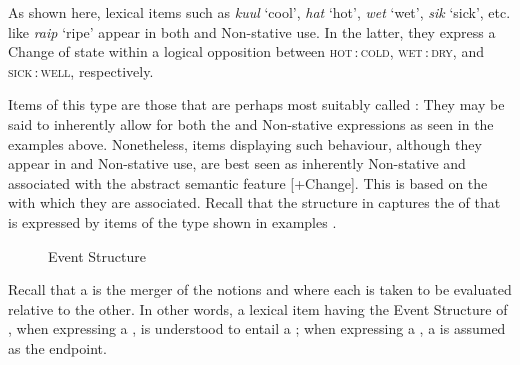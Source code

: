 
\z
\z

As shown here, lexical items such as \textit{kuul} `cool', \textit{hat} `hot', \textit{wet} `wet', \textit{sik} `sick', etc. like \textit{raip} `ripe' appear in both  and Non-stative use. In the latter, they express a Change of state within a logical opposition between \textsc{hot\,:\,cold}, \textsc{wet\,:\,dry}, and \textsc{sick\,:\,well}, respectively. 

Items of this type are those that are perhaps most suitably called : They may be said to inherently allow for both the  and Non-stative expressions as seen in the examples above. Nonetheless, items displaying such behaviour, although they appear in  and Non-stative use, are best seen as inherently Non-stative and associated with the abstract semantic feature [+Change]. This is based on the  with which they are associated. Recall that the structure in  captures the  of  that is expressed by items of the type shown in examples . 

\begin{figure}
\caption{ Event Structure \citep[56]{Pustejovsky1991}\label{ex:5:12}}
\end{figure}


Recall that a  is the merger of the notions  and  where each is taken to be evaluated relative to the other. In other words, a lexical item having the Event Structure of , when expressing a , is understood to entail a ; when expressing a , a  is assumed as the endpoint. 

